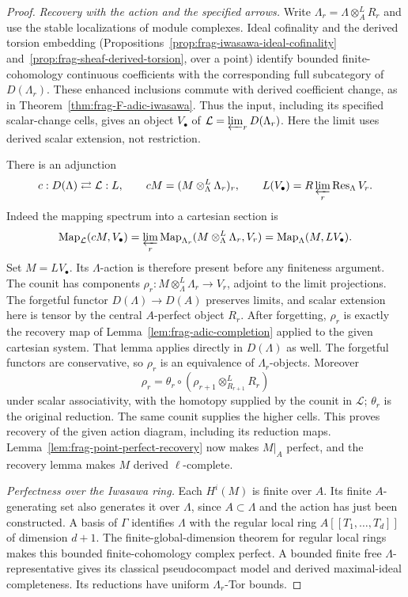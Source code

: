 \documentclass[11pt]{article}
\theoremstyle{definition}
\theoremstyle{remark}
\begin{document}
\begin{proof}
\emph{Recovery with the action and the specified arrows.}
Write $\Lambda_r=\Lambda\otimes_A^LR_r$ and use the stable
localizations of module complexes.  Ideal cofinality and the
derived torsion embedding
(Propositions~\ref{prop:frag-iwasawa-ideal-cofinality}
and~\ref{prop:frag-sheaf-derived-torsion}, over a point) identify
bounded finite-cohomology continuous coefficients with the
corresponding full subcategory of $D(\Lambda_r)$.
These enhanced inclusions commute with derived coefficient change,
as in Theorem~\ref{thm:frag-F-adic-iwasawa}.  Thus the input,
including its specified scalar-change cells, gives an object
$V_\bullet$ of $\mathcal L=\varprojlim_rD(\Lambda_r)$.
Here the limit uses derived scalar extension, not restriction.

There is an adjunction
\[
 c:D(\Lambda)\rightleftarrows\mathcal L:L,\qquad
 cM=(M\otimes_\Lambda^L\Lambda_r)_r,\qquad
 L(V_\bullet)=R\varprojlim_r\operatorname{Res}_\Lambda V_r.
\]
Indeed the mapping spectrum into a cartesian section is
\[
 \operatorname{Map}_{\mathcal L}(cM,V_\bullet)
 =\varprojlim_r\operatorname{Map}_{\Lambda_r}
       (M\otimes_\Lambda^L\Lambda_r,V_r)
 =\operatorname{Map}_{\Lambda}(M,L V_\bullet).
\]
Set $M=L V_\bullet$.  Its $\Lambda$-action is therefore present
before any finiteness argument.  The counit has components
$\rho_r:M\otimes_\Lambda^L\Lambda_r\to V_r$, adjoint to the limit
projections.  The forgetful functor $D(\Lambda)\to D(A)$ preserves
limits, and scalar extension here is tensor by the central
$A$-perfect object $R_r$.  After forgetting, $\rho_r$ is exactly
the recovery map of Lemma~\ref{lem:frag-adic-completion} applied
to the given cartesian system.  That lemma applies directly in
$D(\Lambda)$ as well.  The forgetful functors are conservative,
so $\rho_r$ is an equivalence of $\Lambda_r$-objects.  Moreover
\[
 \rho_r=\theta_r\circ
   (\rho_{r+1}\otimes_{R_{r+1}}^LR_r)
\]
under scalar associativity, with the homotopy supplied by the
counit in $\mathcal L$; $\theta_r$ is the original reduction.
The same counit supplies the higher cells.  This proves recovery
of the given action diagram, including its reduction maps.
Lemma~\ref{lem:frag-point-perfect-recovery} now makes $M|_A$
perfect, and the recovery lemma makes $M$ derived $\ell$-complete.

\emph{Perfectness over the Iwasawa ring.}
Each $H^i(M)$ is finite over $A$.  Its finite $A$-generating set
also generates it over $\Lambda$, since $A\subset\Lambda$ and
the action has just been constructed.  A basis of $\Gamma$ identifies
$\Lambda$ with the regular local ring $A[[T_1,\ldots,T_d]]$ of
dimension $d+1$.  The finite-global-dimension theorem for regular
local rings makes this bounded finite-cohomology complex perfect.
A bounded finite free $\Lambda$-representative gives its classical
pseudocompact model and derived maximal-ideal completeness.
Its reductions have uniform $\Lambda_r$-Tor bounds.


\end{proof}
\end{document}
